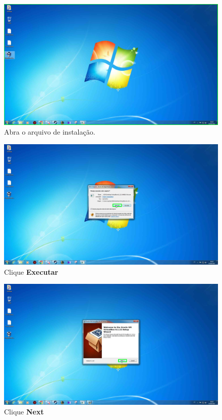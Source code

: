\documentclass[10pt]{article}
\begin{document}
\begin{figure}[H]
    \centering
    \caption{Abra o arquivo de instalação.}
    \label{fig:21}
    \includegraphics[width=\linewidth]{images/instalacao_virtualbox/001.png}
\end{figure}

\begin{figure}[H]
    \centering
    \caption{Clique \textbf{Executar}}
    \label{fig:22}
    \includegraphics[width=\linewidth]{images/instalacao_virtualbox/002.png}
\end{figure}

\begin{figure}[H]
    \centering
    \caption{Clique \textbf{Next}}
    \label{fig:23}
    \includegraphics[width=\linewidth]{images/instalacao_virtualbox/003.png}
\end{figure}
\end{document}
